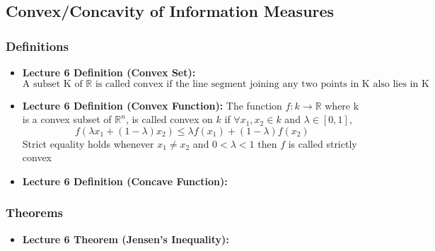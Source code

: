 \documentclass{article}
\begin{document}
\subsection{Convex/Concavity of Information Measures}
\subsubsection{Definitions}
\begin{itemize}
    \item \textbf{Lecture 6 Definition (Convex Set):} \[\text{A subset K of } \mathbb{R} \text{ is called convex if the line segment joining any two points in K also lies in K}\]
    \item \textbf{Lecture 6 Definition (Convex Function):} The function \(f: k \to \mathbb{R}\) where k is a convex subset of \(\mathbb{R}^n\), is called convex on \(k\) if \(\forall x_1,x_2 \in k\) and \(\lambda \in [0,1]\),
    \[f(\lambda x_1 + (1-\lambda)x_2)\leq \lambda f(x_1) + (1-\lambda) f(x_2)\]
    Strict equality holds whenever \(x_1 \neq x_2\) and \(0< \lambda < 1\) then \(f\) is called strictly convex
    \item \textbf{Lecture 6 Definition (Concave Function):}
\end{itemize}
\subsubsection{Theorems}
\begin{itemize}
    \item \textbf{Lecture 6 Theorem (Jensen's Inequality):}
\end{itemize}
\begin{flushleft}
    
\end{flushleft}
\end{document}
